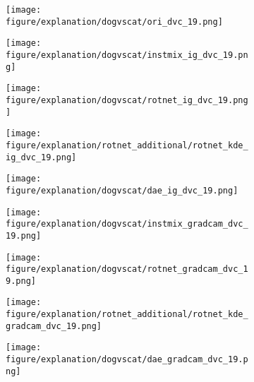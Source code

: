 \documentclass{article} \usepackage{iclr2021_conference,times}
\begin{document}
\begin{figure}[h!]
\centering
\iffalse
\begin{subfigure}{.11\textwidth}
  \centering
  \texttt{[image: figure/explanation/dogvscat/ori\_dvc\_19.png]}
\end{subfigure}
\hspace{-2mm}
\begin{subfigure}{.11\textwidth}
  \centering
  \texttt{[image: figure/explanation/dogvscat/instmix\_ig\_dvc\_19.png]}
\end{subfigure}
\hspace{-2mm}
\begin{subfigure}{.11\textwidth}
  \centering
  \texttt{[image: figure/explanation/dogvscat/rotnet\_ig\_dvc\_19.png]}
\end{subfigure}
\hspace{-2mm}
\begin{subfigure}{.11\textwidth}
  \centering
  \texttt{[image: figure/explanation/rotnet\_additional/rotnet\_kde\_ig\_dvc\_19.png]}
\end{subfigure}
\hspace{-2mm}
\begin{subfigure}{.11\textwidth}
  \centering
  \texttt{[image: figure/explanation/dogvscat/dae\_ig\_dvc\_19.png]}
\end{subfigure}
\hspace{-2mm}
\begin{subfigure}{.11\textwidth}
  \centering
  \texttt{[image: figure/explanation/dogvscat/instmix\_gradcam\_dvc\_19.png]}
\end{subfigure}
\hspace{-2mm}
\begin{subfigure}{.11\textwidth}
  \centering
  \texttt{[image: figure/explanation/dogvscat/rotnet\_gradcam\_dvc\_19.png]}
\end{subfigure}
\hspace{-2mm}
\begin{subfigure}{.11\textwidth}
  \centering
  \texttt{[image: figure/explanation/rotnet\_additional/rotnet\_kde\_gradcam\_dvc\_19.png]}
\end{subfigure}
\hspace{-2mm}
\begin{subfigure}{.11\textwidth}
  \centering
  \texttt{[image: figure/explanation/dogvscat/dae\_gradcam\_dvc\_19.png]}
\end{subfigure}\\

\end{figure}
\end{document}
